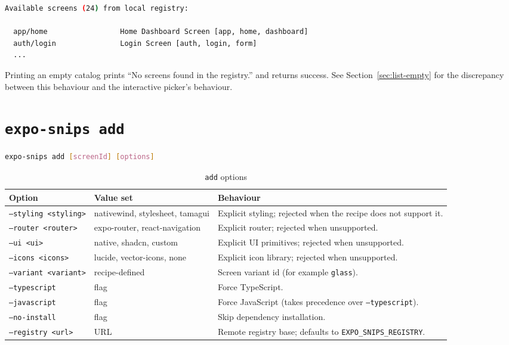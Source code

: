 \begin{lstlisting}[language=bash]
Available screens (24) from local registry:

  app/home                 Home Dashboard Screen [app, home, dashboard]
  auth/login               Login Screen [auth, login, form]
  ...
\end{lstlisting}

Printing an empty catalog prints ``No screens found in the registry.'' and returns
success. See Section~\ref{sec:list-empty} for the discrepancy between this
behaviour and the interactive picker's behaviour.

\section{\texttt{expo-snips add}}

\begin{lstlisting}[language=bash]
expo-snips add [screenId] [options]
\end{lstlisting}

\begin{longtable}{p{3.4cm}p{2.9cm}p{8.5cm}}
\caption{\texttt{add} options}\\
\toprule
\textbf{Option} & \textbf{Value set} & \textbf{Behaviour} \\
\midrule

\texttt{--styling <styling>} & nativewind, stylesheet, tamagui & Explicit styling; rejected when the recipe does not support it. \\
\texttt{--router <router>} & expo-router, react-navigation & Explicit router; rejected when unsupported. \\
\texttt{--ui <ui>} & native, shadcn, custom & Explicit UI primitives; rejected when unsupported. \\
\texttt{--icons <icons>} & lucide, vector-icons, none & Explicit icon library; rejected when unsupported. \\
\texttt{--variant <variant>} & recipe-defined & Screen variant id (for example \texttt{glass}). \\
\texttt{--typescript} & flag & Force TypeScript. \\
\texttt{--javascript} & flag & Force JavaScript (takes precedence over \texttt{--typescript}). \\
\texttt{--no-install} & flag & Skip dependency installation. \\
\texttt{--registry <url>} & URL & Remote registry base; defaults to \texttt{EXPO\_SNIPS\_REGISTRY}. \\
\bottomrule
\end{longtable}

